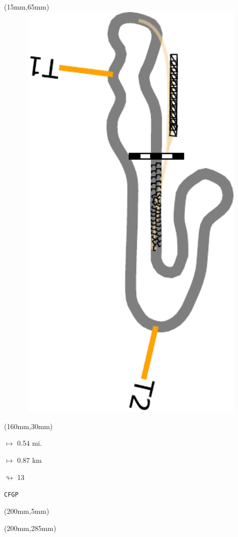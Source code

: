 \begin{textblock*}{185mm}(15mm,65mm)%
\centering
\mbox{\includegraphics[width=185mm,height=210mm,keepaspectratio]{PT/CFGP.pdf}}
\end{textblock*}
\begin{textblock*}{40mm}(160mm,30mm)%
\Large
\par$\mapsto$ 0.54 mi.
\par$\mapsto$ 0.87 km
\par$\looparrowright$ 13
\par\hfill\tiny\tt CFGP\\
\end{textblock*}
\begin{textblock*}{20mm}(200mm,5mm)%
\fbox{\thepage}
\label{CFGP}
\end{textblock*}
\begin{textblock*}{20mm}(200mm,285mm)%
\fbox{\thepage}
\end{textblock*}

